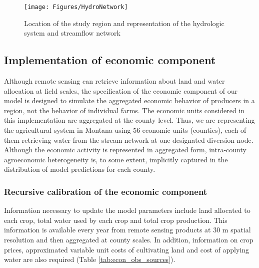 \begin{figure}[t]
    \centering
    \texttt{[image: Figures/HydroNetwork]}
    \label{fig:hydro_network}
    \caption{Location of the study region and representation of the hydrologic system and streamflow network}
\end{figure}


\subsection{Implementation of economic component}

Although remote sensing can retrieve information about land and water allocation at field scales, the specification of the economic component of our model is designed to simulate the aggregated economic behavior of producers in a region, not the behavior of individual farms. The economic units considered in this implementation are aggregated at the county level. Thus, we are representing the agricultural system in Montana using 56 economic units (counties), each of them retrieving water from the stream network at one designated diversion node. Although the economic activity is represented in aggregated form, intra-county agroeconomic heterogeneity is, to some extent, implicitly captured in the distribution of model predictions for each county.

\subsubsection{Recursive calibration of the economic component}

Information necessary to update the model parameters include land allocated to each crop, total water used by each crop and total crop production. This information is available every year from remote sensing products at 30 m spatial resolution and then aggregated at county scales. In addition, information on crop prices, approximated variable unit costs of cultivating land and cost of applying water are also required (Table \ref{tab:econ_obs_sources}).

